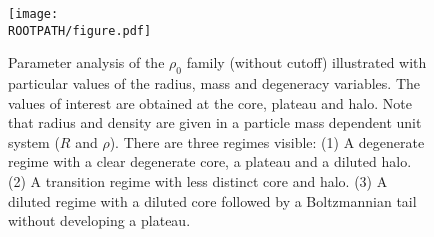 \begin{figure}%
	\centering%
	\texttt{[image: \\ROOTPATH/figure.pdf]}
	\caption{Parameter analysis of the $\rho_0$ family (without cutoff) illustrated with particular values of the radius, mass and degeneracy variables. The values of interest are obtained at the core, plateau and halo. Note that radius and density are given in a particle mass dependent unit system ($R$ and $\rho$). There are three regimes visible: (1) A degenerate regime with a clear degenerate core, a plateau and a diluted halo. (2) A transition regime with less distinct core and halo. (3) A diluted regime with a diluted core followed by a Boltzmannian tail without developing a plateau.}%
	\label{fig:analysis:without-cutoff:central-density:raw}%
\end{figure}